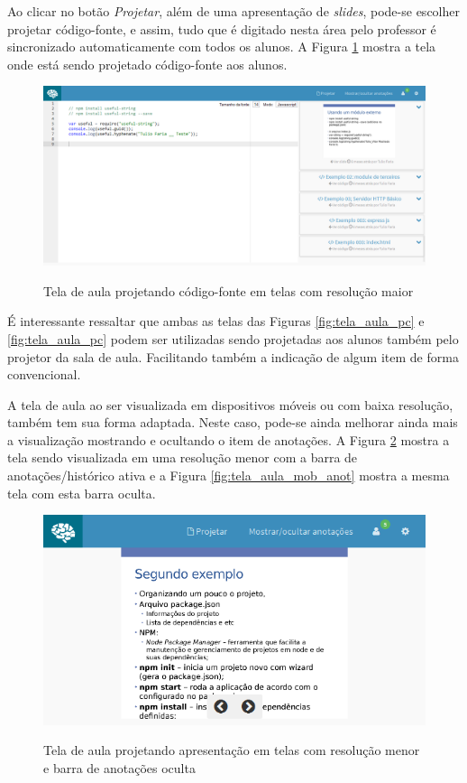 Ao clicar no botão \emph{Projetar}, além de uma apresentação de \emph{slides}, pode-se escolher projetar código-fonte, e assim, tudo que é digitado nesta área pelo professor é sincronizado automaticamente com todos os alunos. A Figura \ref{fig:tela_aula_pc_codigo} mostra a tela onde está sendo projetado código-fonte aos alunos.

\begin{figure}[h]
\centering
\caption{Tela de aula projetando código-fonte em telas com resolução maior}
\includegraphics[width=1.0\textwidth]{imgs/tela_aula_pc_codigo.png} 
\label{fig:tela_aula_pc_codigo} 
\end{figure}

É interessante ressaltar que ambas as telas das Figuras \ref{fig:tela_aula_pc} e \ref{fig:tela_aula_pc} podem ser utilizadas sendo projetadas aos alunos também pelo projetor da sala de aula. Facilitando também a indicação de algum item de forma convencional.

A tela de aula ao ser visualizada em dispositivos móveis ou com baixa resolução, também tem sua forma adaptada. Neste caso, pode-se ainda melhorar ainda mais a visualização mostrando e ocultando o item de anotações. A Figura \ref{fig:tela_aula_mob} mostra a tela sendo visualizada em uma resolução menor com a barra de anotações/histórico ativa e a Figura \ref{fig:tela_aula_mob_anot} mostra a mesma tela com esta barra oculta.

\begin{figure}[h]
\centering
\caption{Tela de aula projetando apresentação em telas com resolução menor e barra de anotações oculta}
\includegraphics[width=1.0\textwidth]{imgs/tela_aula_slide_mob.png} 
\label{fig:tela_aula_mob} 
\end{figure}

